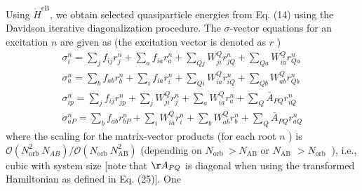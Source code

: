 Using $\dot{H}^{\mathrm{eB}}$, we obtain selected quasiparticle energies from Eq. (14) using the Davidson iterative diagonalization procedure. The $\sigma$-vector equations for an excitation $n$ are given as (the excitation vector is denoted as $r$ )
$$
\begin{gathered}
\sigma_i^n=\sum_j f_{i j} r_j^n+\sum_a f_{i a} r_a^n+\sum_{Q j} W_{j i}^Q r_{j Q}^n+\sum_{Q a} W_{i a}^Q r_{Q a}^n \\
\sigma_a^n=\sum_b f_{a b} r_b^n+\sum_i f_{i a} r_i^n+\sum_{Q i} W_{i a}^Q r_{i Q}^n+\sum_{Q b} W_{a b}^Q r_{Q b}^n \\
\sigma_{i p}^n=\sum_j f_{i j} r_{j p}^n+\sum_j W_{j i}^Q r_j^n+\sum_a W_{i a}^Q r_a^n+\sum_Q \bar{A}_{P Q} r_{i Q}^n \\
\sigma_{a P}^n=\sum_b f_{a b} r_{b P}^n+\sum_i W_{i a}^Q r_i^n+\sum_b W_{a b}^Q r_b^n+\sum_Q \bar{A}_{P Q} r_{a Q}^n
\end{gathered}
$$
where the scaling for the matrix-vector products (for each root $n$ ) is $\mathcal{O}\left(N_{\text {orb }}^2 N_{A B}\right) / \mathcal{O}\left(N_{\text {orb }} N_{\mathrm{AB}}^2\right)$ (depending on $N_{\text {orb }}>N_{\mathrm{AB}}$ or $N_{\mathrm{AB}}$ $>N_{\text {orb }}$ ), i.e., cubic with system size [note that $\AA_{P Q}$ is diagonal when using the transformed Hamiltonian as defined in Eq. (25)]. One